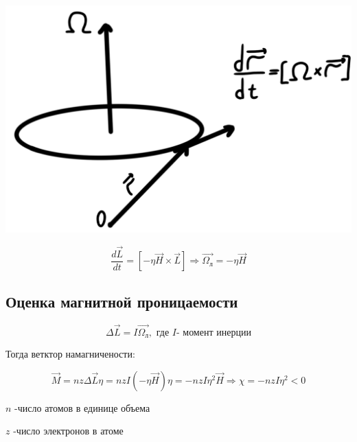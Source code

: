 \begin{minipage}[c]{0.5\textwidth} %
    \includegraphics[width=\textwidth]{im/77.png} %
\end{minipage}%
\hfill
\begin{minipage}[c]{0.6\textwidth} %
    \[
     \frac{d\vec{L}}{dt}=[-\eta\vec{H}\times \vec{L}]\Rightarrow\vec{\Omega_{\text{л}}}=-\eta\vec{H}
    \]
\end{minipage}

\subsection*{Оценка магнитной проницаемости}

\[
\Delta \vec{L}=I\vec{\Omega_{\text{л}}},\text{ где } I \text{- момент инерции}
\]

Тогда ветктор намагничености:

\[
\vec{M}=nz\Delta\vec{L}\eta=nzI(-\eta\vec{H})\eta=-nzI\eta^2\vec{H}\Rightarrow \chi=-nzI\eta^2<0
\]

\( n \) -число атомов в единице объема 

\( z \) -число электронов в атоме 
